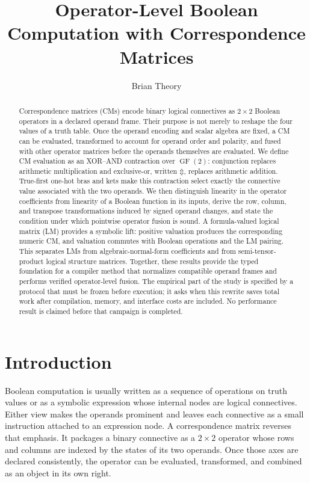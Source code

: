 \documentclass[11pt]{article}
\title{Operator-Level Boolean Computation with Correspondence Matrices}
\author{Brian Theory}
\date{}
\newcommand{\GFtwo}{\operatorname{GF}(2)}
\newcommand{\XOR}{\mathbin{\Updownarrow}}
\begin{document}
\maketitle

\begin{abstract}
Correspondence matrices (CMs) encode binary logical connectives as
$2\times2$ Boolean operators in a declared operand frame. Their purpose is not
merely to reshape the four values of a truth table. Once the operand encoding
and scalar algebra are fixed, a CM can be evaluated, transformed to account
for operand order and polarity, and fused with other operator matrices before
the operands themselves are evaluated. We define CM evaluation as an
XOR--AND contraction over $\GFtwo$: conjunction replaces arithmetic
multiplication and exclusive-or, written $\XOR$, replaces arithmetic addition.
True-first one-hot bras and kets make this contraction select exactly the
connective value associated with the two operands. We then distinguish
linearity in the operator coefficients from linearity of a Boolean function
in its inputs, derive the row, column, and transpose transformations induced
by signed operand changes, and state the condition under which pointwise
operator fusion is sound. A formula-valued logical matrix (LM) provides a
symbolic lift: positive valuation produces the corresponding numeric CM, and
valuation commutes with Boolean operations and the LM pairing. This separates
LMs from algebraic-normal-form coefficients and from semi-tensor-product
logical structure matrices. Together, these results provide the typed
foundation for a compiler method that normalizes compatible operand frames
and performs verified operator-level fusion. The empirical part of the study
is specified by a protocol that must be frozen before execution; it asks when
this rewrite saves total work after compilation, memory, and interface costs
are included. No performance result is claimed before that campaign is
completed.
\end{abstract}


\section{Introduction}
\label{sec:introduction}

Boolean computation is usually written as a sequence of operations on truth
values or as a symbolic expression whose internal nodes are logical
connectives. Either view makes the operands prominent and leaves each
connective as a small instruction attached to an expression node. A
correspondence matrix reverses that emphasis. It packages a binary connective
as a $2\times2$ operator whose rows and columns are indexed by the states of
its two operands. Once those axes are declared consistently, the operator can
be evaluated, transformed, and combined as an object in its own right.
\end{document}
